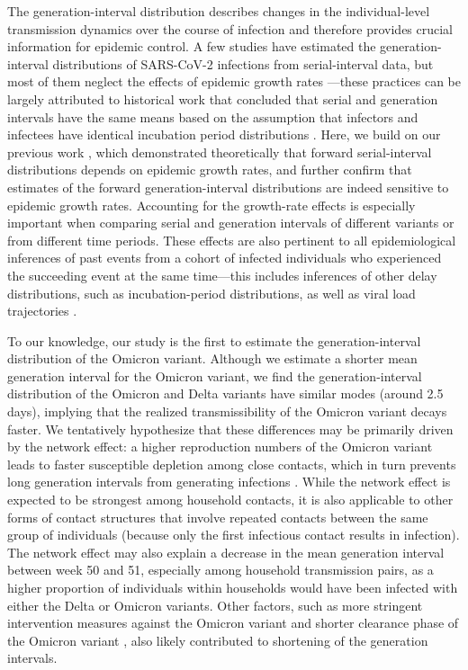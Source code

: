 \documentclass[12pt]{article}
\begin{document}
The generation-interval distribution describes changes in the individual-level transmission dynamics over the course of infection and therefore provides crucial information for epidemic control.
A few studies have estimated the generation-interval distributions of SARS-CoV-2 infections from serial-interval data, but most of them neglect the effects of epidemic growth rates \citep{ganyani2020estimating,he2020temporal,zhao2021estimating,hart2022generation}---these practices can be largely attributed to historical work that concluded that serial and generation intervals have the same means based on the assumption that infectors and infectees have identical incubation period distributions \citep{svensson2007note,britton2019estimation,lehtinen2021relationship}.
Here, we build on our previous work \citep{park2021forward}, which demonstrated theoretically that forward serial-interval distributions depends on epidemic growth rates, and further confirm that estimates of the forward generation-interval distributions are indeed sensitive to epidemic growth rates.
Accounting for the growth-rate effects is especially important when comparing serial and generation intervals of different variants or from different time periods.
These effects are also pertinent to all epidemiological inferences of past events from a cohort of infected individuals who experienced the succeeding event at the same time---this includes inferences of other delay distributions, such as incubation-period distributions, as well as viral load trajectories \citep{hay2021estimating}.

To our knowledge, our study is the first to estimate the generation-interval distribution of the Omicron variant.
Although we estimate a shorter mean generation interval for the Omicron variant, we find the generation-interval distribution of the Omicron and Delta variants have similar modes (around 2.5 days), implying that the realized transmissibility of the Omicron variant decays faster.
We tentatively hypothesize that these differences may be primarily driven by the network effect: a higher reproduction numbers of the Omicron variant leads to faster susceptible depletion among close contacts, which in turn prevents long generation intervals from generating infections \citep{park2020inferring,hart2022generation}. 
While the network effect is expected to be strongest among household contacts, it is also applicable to other forms of contact structures that involve repeated contacts between the same group of individuals (because only the first infectious contact results in infection).
The network effect may also explain a decrease in the mean generation interval between week 50 and 51, especially among household transmission pairs, as a higher proportion of individuals within households would have been infected with either the Delta or Omicron variants.
Other factors, such as more stringent intervention measures against the Omicron variant \citep{backer2021omicron} and shorter clearance phase of the Omicron variant \citep{hay2022viral}, also likely contributed to shortening of the generation intervals.
\end{document}
